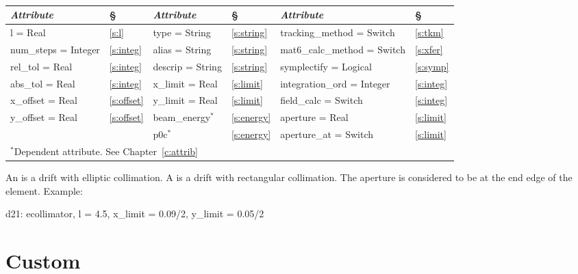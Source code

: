 \begin{center}
\tt
\begin{tabular}{|l|l||l|l||l|l|} \hline
  {\sl Attribute} & \S  & {\sl Attribute} & \S & {\sl Attribute} & \S \\ \hline
  l        = Real       & \ref{s:l}      & type = String    & \ref{s:string} & tracking\_method = Switch    & \ref{s:tkm}   \\ \hline
  num\_steps = Integer  & \ref{s:integ}  & alias = String   & \ref{s:string} & mat6\_calc\_method = Switch  & \ref{s:xfer}  \\ \hline
  rel\_tol = Real       & \ref{s:integ}  & descrip = String & \ref{s:string} & symplectify = Logical        & \ref{s:symp}  \\ \hline
  abs\_tol = Real       & \ref{s:integ}  & x\_limit = Real  & \ref{s:limit}  & integration\_ord = Integer   & \ref{s:integ} \\ \hline
  x\_offset  = Real     & \ref{s:offset} & y\_limit = Real  & \ref{s:limit}  & field\_calc = Switch         & \ref{s:integ} \\ \hline
  y\_offset  = Real     & \ref{s:offset} & beam\_energy$^*$ & \ref{s:energy} & aperture = Real              & \ref{s:limit} \\ \hline
                        &                & p0c$^*$          & \ref{s:energy} & aperture\_at = Switch        & \ref{s:limit} \\ \hline
  \multicolumn{6}{l}{\small $^*$Dependent attribute. See Chapter~\ref{c:attrib}} \\
\end{tabular}
\end{center}
\toffset

An  is a drift with elliptic collimation.
A  is a drift with rectangular collimation.
The aperture is considered to be at the end edge of the element.
Example:
\begin{example}
  d21: ecollimator, l = 4.5, x_limit = 0.09/2, y_limit = 0.05/2
\end{example}

\section{Custom}
\label{s:custom}

